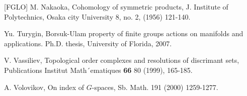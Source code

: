 \documentclass{amsart}
\numberwithin{equation}{section}
\theoremstyle{plain}
\theoremstyle{definition}
\begin{document}
\begin{thebibliography}{[FGLO]}
 M. Nakaoka, Cohomology of symmetric products, J. Institute of Polytechnics, Osaka city University 8,
no. 2, (1956) 121-140.


  Yu. Turygin,  Borsuk-Ulam property of finite groups actions 
  on manifolds and applications.  Ph.D. thesis, University of Florida, 2007.

 V. Vassiliev, Topological order complexes and resolutions of discrimant sets, Publications Institut
Math´ematiques {\bf 66}  80 (1999), 165-185.

 A. Volovikov, On index of $G$-spaces, Sb. Math. 191 (2000) 1259-1277.

\end{thebibliography}
\end{document}
